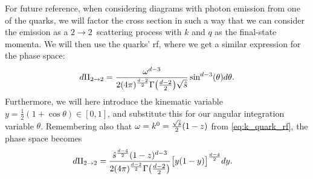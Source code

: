 For future reference, when considering diagrams with photon emission from one of the quarks, we will factor the cross section in such a way that we can consider the emission as a $2\to2$~scattering process with $k$ and $q$ as the final-state momenta. We will then use the quarks' \gls{rf}, where we get a similar expression for the phase space:
\begin{equation}
    d\Pi_{2 \to 2} = \frac{\omega^{d-3}}{2(4\pi)^{\frac{d-2}{2}} \Gamma\bigl(\frac{d-2}{2}\bigr) \sqrt{\hat{s}}} \sin^{d-3}(\theta)d\theta.
\end{equation}
Furthermore, we will here introduce the kinematic variable $y=\frac{1}{2}(1+\cos\theta) \in [0,1]$, and substitute this for our angular integration variable $\theta$. Remembering also that $\omega = k^0 = \frac{\sqrt{\hat{s}}}{2}(1-z)$ from \cref{eq:k_quark_rf}, the phase space becomes
\begin{align}
    d\Pi_{2 \to 2} &= \frac{\hat{s}^{\frac{d-4}{2}}(1-z)^{d-3}}{2(4\pi)^{\frac{d-2}{2}} \Gamma\bigl(\frac{d-2}{2}\bigr)}
    \bigl[y(1-y)\bigr]^{\frac{d-4}{2}}dy.
    \label{eq:dPi_2_k}
\end{align}


